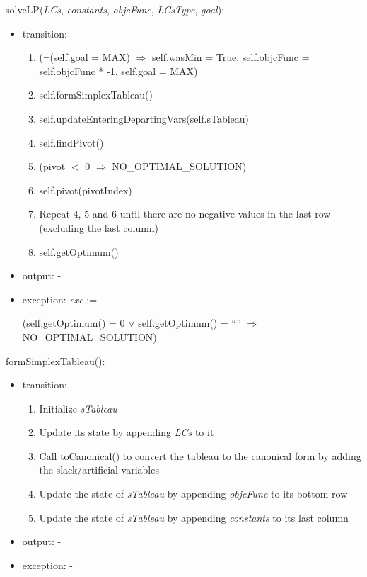 \documentclass[12pt, titlepage]{article}
\begin{document}
\noindent 
solveLP(\textit{LCs}, \textit{constants}, \textit{objcFunc}, \textit{LCsType}, 
\textit{goal}):
\begin{itemize}
	\item transition: 
	\begin{enumerate}
		\item ($\neg$(self.goal = MAX) $\Rightarrow$ self.wasMin = True, 
		self.objcFunc = self.objcFunc * -1, self.goal = MAX)
		\item self.formSimplexTableau()
		\item self.updateEnteringDepartingVars(self.sTableau)
		\item self.findPivot()
		\item (pivot $<$ 0 $\Rightarrow$ NO\_OPTIMAL\_SOLUTION)
		\item self.pivot(pivotIndex)
		\item Repeat 4, 5 and 6 until there are no negative values in the last 
		row (excluding the last column)
		\item self.getOptimum()
	\end{enumerate}
	
	\item output: -
	\item exception: \textit{exc} := 
	
	(self.getOptimum() = 0 $\vee$ self.getOptimum() = ``'' $\Rightarrow$ 
	NO\_OPTIMAL\_SOLUTION)
\end{itemize}

\noindent
formSimplexTableau():
\begin{itemize}
	\item transition:
	\begin{enumerate}
		\item Initialize \textit{sTableau}
		\item Update its state by appending \textit{LCs} to it
		\item Call toCanonical() to convert the tableau to the canonical form 
		by adding the slack/artificial variables
		\item Update the state of \textit{sTableau} by appending 
		\textit{objcFunc} to its bottom row
		\item Update the state of \textit{sTableau} by appending 
		\textit{constants} to its last column
	\end{enumerate}
	\item output: -
	\item exception: -
\end{itemize}
\end{document}
